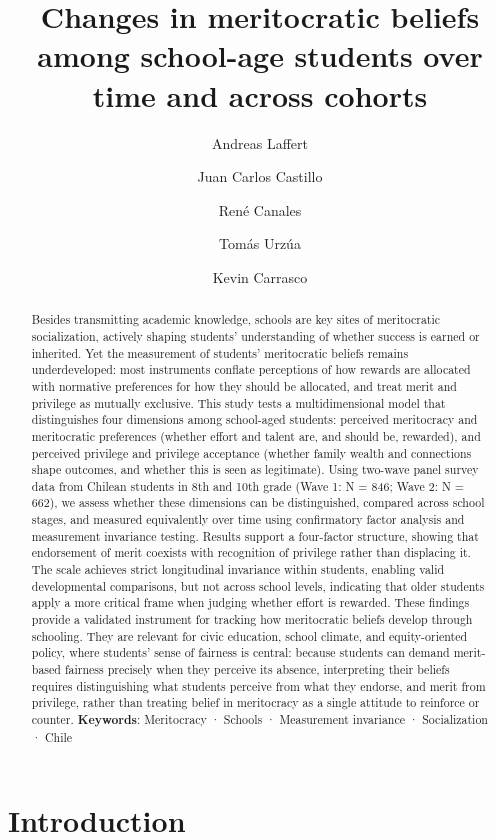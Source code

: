 \documentclass[
  13pt,
]{article}
\title{Changes in meritocratic beliefs among school-age students over
time and across cohorts}
\author{Andreas Laffert}
\affil{%
                  Institute of Sociology, Pontifical Catholic University
                  of Chile
              }
\author{Juan Carlos Castillo}
\affil{%
                  Department of Sociology, University of Chile
              }
\author{René Canales}
\affil{%
                  Institute of Sociology, Pontifical Catholic University
                  of Chile
              }
\author{Tomás Urzúa}
\affil{%
                  Department of Sociology, University of Chile
              }
\author{Kevin Carrasco}
\affil{%
                  Department of Sociology, University of Chile
              }
\date{}
\begin{document}
\maketitle
\begin{abstract}
Besides transmitting academic knowledge, schools are key sites of
meritocratic socialization, actively shaping students' understanding of
whether success is earned or inherited. Yet the measurement of students'
meritocratic beliefs remains underdeveloped: most instruments conflate
perceptions of how rewards are allocated with normative preferences for
how they should be allocated, and treat merit and privilege as mutually
exclusive. This study tests a multidimensional model that distinguishes
four dimensions among school-aged students: perceived meritocracy and
meritocratic preferences (whether effort and talent are, and should be,
rewarded), and perceived privilege and privilege acceptance (whether
family wealth and connections shape outcomes, and whether this is seen
as legitimate). Using two-wave panel survey data from Chilean students
in 8th and 10th grade (Wave 1: N = 846; Wave 2: N = 662), we assess
whether these dimensions can be distinguished, compared across school
stages, and measured equivalently over time using confirmatory factor
analysis and measurement invariance testing. Results support a
four-factor structure, showing that endorsement of merit coexists with
recognition of privilege rather than displacing it. The scale achieves
strict longitudinal invariance within students, enabling valid
developmental comparisons, but not across school levels, indicating that
older students apply a more critical frame when judging whether effort
is rewarded. These findings provide a validated instrument for tracking
how meritocratic beliefs develop through schooling. They are relevant
for civic education, school climate, and equity-oriented policy, where
students' sense of fairness is central: because students can demand
merit-based fairness precisely when they perceive its absence,
interpreting their beliefs requires distinguishing what students
perceive from what they endorse, and merit from privilege, rather than
treating belief in meritocracy as a single attitude to reinforce or
counter. \newline \textbf{Keywords}: Meritocracy · Schools · Measurement
invariance · Socialization · Chile
\end{abstract}


\section{Introduction}\label{introduction}
\end{document}

